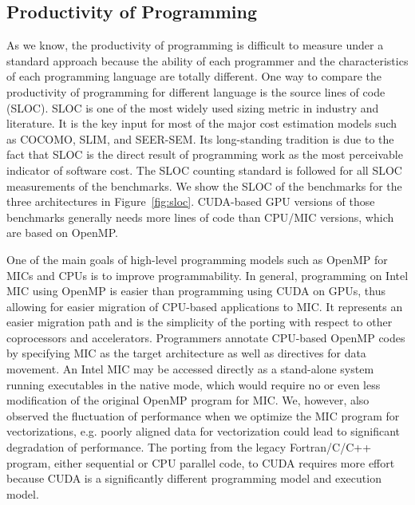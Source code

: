 \subsection{Productivity of Programming} 
As we know, the productivity of programming is difficult to measure under a standard approach because the ability of each programmer and the characteristics of each programming language are totally different. One way to compare the productivity of programming for different language is the source lines of code (SLOC). SLOC is one of the most widely used sizing metric in industry and literature. It is the key input for most of the major cost estimation models such as COCOMO, SLIM, and SEER-SEM.  Its long-standing tradition is due to the fact that SLOC is the direct result of programming work as the most perceivable indicator of software cost. The SLOC counting standard \cite{nguyen2007sloc} is followed for all SLOC measurements of the benchmarks. We show the SLOC of the benchmarks for 
the three architectures in Figure~\ref{fig:sloc}. CUDA-based GPU versions of those benchmarks generally needs more lines of code than 
CPU/MIC versions, which are based on OpenMP.  

One of the main goals of high-level programming models such as OpenMP for MICs and CPUs is to improve programmability. 
In general, programming on Intel MIC using OpenMP is easier than programming using CUDA on GPUs, thus allowing for easier 
migration of CPU-based applications to MIC. It represents an easier migration path and is the simplicity of the porting with respect to other coprocessors and accelerators.
Programmers annotate CPU-based OpenMP codes by specifying MIC as the target architecture as well as directives for data movement. 
An Intel MIC may be accessed directly as a stand-alone system running executables in the native mode, which would require no or even 
less modification of the original OpenMP program for MIC. We, however, also observed the fluctuation of performance when we optimize
the MIC program for vectorizations, e.g. poorly aligned data for vectorization could lead to significant degradation of performance. 
The porting from the legacy Fortran/C/C++ program, either sequential or CPU parallel code, to CUDA 
requires more effort because CUDA is a significantly different programming model and execution model.

